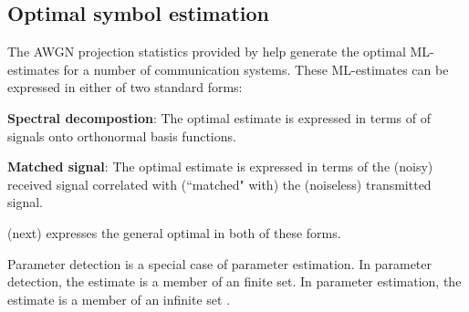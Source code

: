 \begin{proposition}
\section{Optimal symbol estimation}
\label{sec:awgn_est}
The AWGN projection statistics provided by
 help generate the optimal
ML-estimates for a number of communication systems.
These ML-estimates can be expressed in either of two standard forms:
\begin{liste}
  \item {\bf Spectral decompostion}:
     The optimal estimate is expressed in terms of 
     of signals onto orthonormal basis functions.
  \item {\bf Matched signal}:
     The optimal estimate is expressed in terms of the (noisy)
     received signal correlated with (``matched" with)
     the (noiseless) transmitted signal.
\end{liste}
 (next) expresses the general
optimal  in both of these forms.

Parameter detection is a special case of parameter estimation.
In parameter detection, the estimate is a member of an finite set.
In parameter estimation, the estimate is a member of an infinite set
.



\end{proposition}
